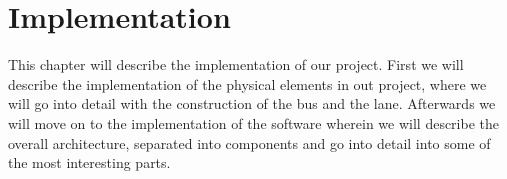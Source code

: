 \chapter{Implementation}
This chapter will describe the implementation of our project. First we will describe the implementation of the physical elements in out project, where we will go into detail with the construction of the bus and the lane.
Afterwards we will move on to the implementation of the software wherein we will describe the overall architecture, separated into components and go into detail into some of the most interesting parts.








